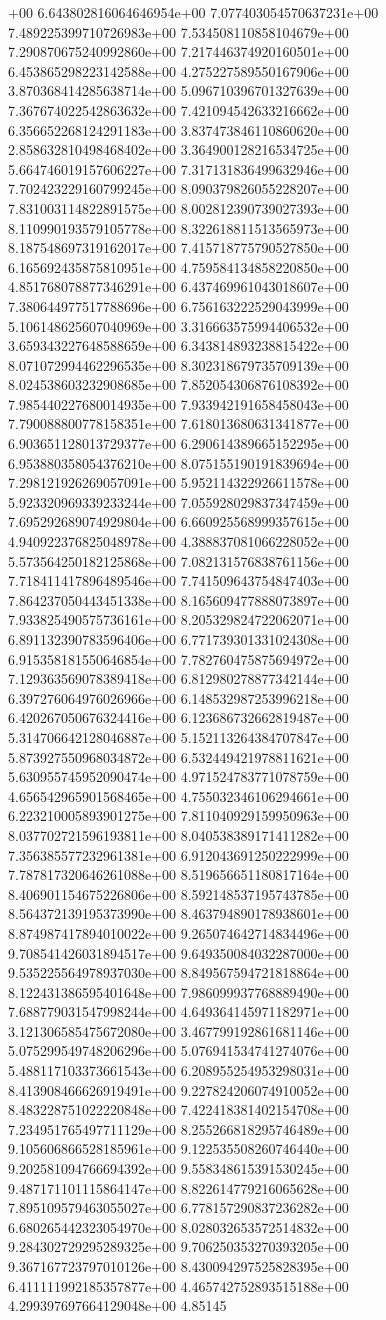 +00	6.643802816064646954e+00	7.077403054570637231e+00	7.489225399710726983e+00	7.534508110858104679e+00	7.290870675240992860e+00	7.217446374920160501e+00	6.453865298223142588e+00	4.275227589550167906e+00	3.870368414285638714e+00	5.096710396701327639e+00	7.367674022542863632e+00	7.421094542633216662e+00	6.356652268124291183e+00	3.837473846110860620e+00	2.858632810498468402e+00	3.364900128216534725e+00	5.664746019157606227e+00	7.317131836499632946e+00	7.702423229160799245e+00	8.090379826055228207e+00	7.831003114822891575e+00	8.002812390739027393e+00	8.110990193579105778e+00	8.322618811513565973e+00	8.187548697319162017e+00	7.415718775790527850e+00	6.165692435875810951e+00	4.759584134858220850e+00	4.851768078877346291e+00	6.437469961043018607e+00	7.380644977517788696e+00	6.756163222529043999e+00	5.106148625607040969e+00	3.316663575994406532e+00	3.659343227648588659e+00	6.343814893238815422e+00	8.071072994462296535e+00	8.302318679735709139e+00	8.024538603232908685e+00	7.852054306876108392e+00	7.985440227680014935e+00	7.933942191658458043e+00	7.790088800778158351e+00	7.618013680631341877e+00	6.903651128013729377e+00	6.290614389665152295e+00	6.953880358054376210e+00	8.075155190191839694e+00	7.298121926269057091e+00	5.952114322926611578e+00	5.923320969339233244e+00	7.055928029837347459e+00	7.695292689074929804e+00	6.660925568999357615e+00	4.940922376825048978e+00	4.388837081066228052e+00	5.573564250182125868e+00	7.082131576838761156e+00	7.718411417896489546e+00	7.741509643754847403e+00	7.864237050443451338e+00	8.165609477888073897e+00	7.933825490575736161e+00	8.205329824722062071e+00	6.891132390783596406e+00	6.771739301331024308e+00	6.915358181550646854e+00	7.782760475875694972e+00	7.129363569078389418e+00	6.812980278877342144e+00	6.397276064976026966e+00	6.148532987253996218e+00	6.420267050676324416e+00	6.123686732662819487e+00	5.314706642128046887e+00	5.152113264384707847e+00	5.873927550968034872e+00	6.532449421978811621e+00	5.630955745952090474e+00	4.971524783771078759e+00	4.656542965901568465e+00	4.755032346106294661e+00	6.223210005893901275e+00	7.811040929159950963e+00	8.037702721596193811e+00	8.040538389171411282e+00	7.356385577232961381e+00	6.912043691250222999e+00	7.787817320646261088e+00	8.519656651180817164e+00	8.406901154675226806e+00	8.592148537195743785e+00	8.564372139195373990e+00	8.463794890178938601e+00	8.874987417894010022e+00	9.265074642714834496e+00	9.708541426031894517e+00	9.649350084032287000e+00	9.535225564978937030e+00	8.849567594721818864e+00	8.122431386595401648e+00	7.986099937768889490e+00	7.688779031547998244e+00	4.649364145971182971e+00	3.121306585475672080e+00	3.467799192861681146e+00	5.075299549748206296e+00	5.076941534741274076e+00	5.488117103373661543e+00	6.208955254953298031e+00	8.413908466626919491e+00	9.227824206074910052e+00	8.483228751022220848e+00	7.422418381402154708e+00	7.234951765497711129e+00	8.255266818295746489e+00	9.105606866528185961e+00	9.122535508260746440e+00	9.202581094766694392e+00	9.558348615391530245e+00	9.487171101115864147e+00	8.822614779216065628e+00	7.895109579463055027e+00	6.778157290837236282e+00	6.680265442323054970e+00	8.028032653572514832e+00	9.284302729295289325e+00	9.706250353270393205e+00	9.367167723797010126e+00	8.430094297525828395e+00	6.411111992185357877e+00	4.465742752893515188e+00	4.299397697664129048e+00	4.85145